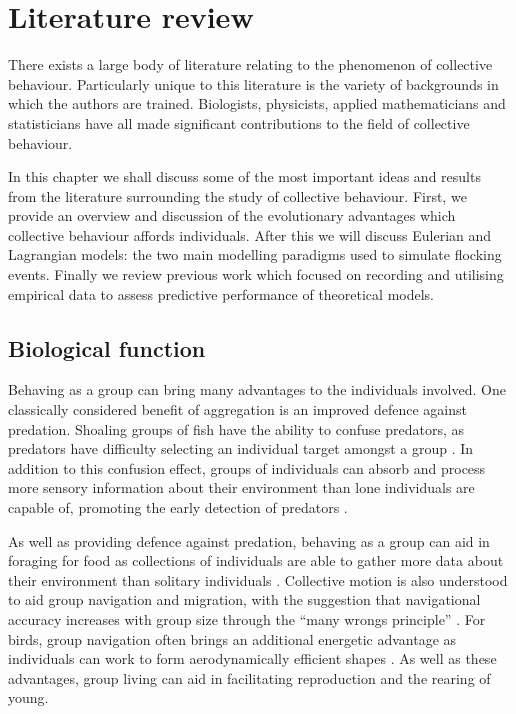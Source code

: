 \graphicspath{{fig/lit_review/}}

\chapter{Literature review}
\label{cha:lit_review}

There exists a large body of literature relating to the phenomenon of
collective behaviour. Particularly unique to this literature is the variety of
backgrounds in which the authors are trained. Biologists, physicists, applied
mathematicians and statisticians have all made significant contributions to the
field of collective behaviour.

In this chapter we shall discuss some of the most important ideas and results
from the literature surrounding the study of collective behaviour. First, we
provide an overview and discussion of the evolutionary advantages which
collective behaviour affords individuals. After this we will discuss Eulerian
and Lagrangian models: the two main modelling paradigms used to simulate
flocking events. Finally we review previous work which focused on recording and
utilising empirical data to assess predictive performance of theoretical
models.

\section{Biological function}
\label{sec:biological_function}

Behaving as a group can bring many advantages to the individuals involved. One
classically considered benefit of aggregation is an improved defence against
predation. Shoaling groups of fish have the ability to confuse predators, as
predators have difficulty selecting an individual target amongst a group
\parencite{landeau86}. In addition to this confusion effect, groups of
individuals can absorb and process more sensory information about their
environment than lone individuals are capable of, promoting the early detection
of predators \parencite{pitcher93}.

As well as providing defence against predation, behaving as a group can aid in
foraging for food as collections of individuals are able to gather more data
about their environment than solitary individuals \parencite{clark86}.
Collective motion is also understood to aid group navigation and migration,
with the suggestion that navigational accuracy increases with group size
through the ``many wrongs principle'' \parencite{simmons04}. For birds, group
navigation often brings an additional energetic advantage as individuals can
work to form aerodynamically efficient shapes \parencite{weimerskirch01}. As
well as these advantages, group living can aid in facilitating reproduction and
the rearing of young.

